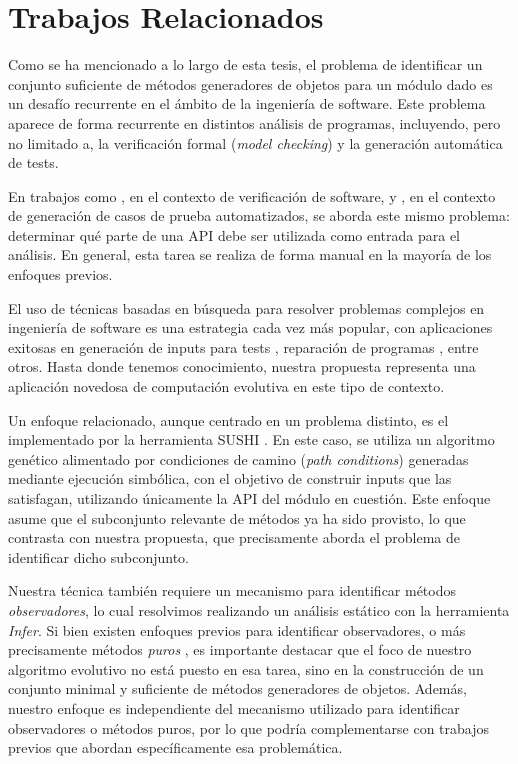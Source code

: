 \chapter[Trabajos Relacionados]{Trabajos Relacionados}
\label{cap:related-work}

Como se ha mencionado a lo largo de esta tesis, el problema de identificar un conjunto suficiente de métodos generadores de objetos 
para un módulo dado es un desafío recurrente en el ámbito de la ingeniería de software. Este problema
aparece de forma recurrente en distintos análisis de programas, incluyendo, pero no limitado a, la verificación formal 
(\emph{model checking}) y la generación automática de tests.

En trabajos como \cite{DBLP:conf/tacas/NoriRTT09,DBLP:conf/tacas/KhurshidPV03}, en el contexto de verificación 
de software, y \cite{Tillmann:2010,Tillmann:2008,paPacheco07,DBLP:conf/icse/BraioneDMP18}, en el contexto de generación de 
casos de prueba automatizados, se aborda este mismo problema: determinar qué parte de una API debe ser utilizada como entrada 
para el análisis. En general, esta tarea se realiza de forma manual en la mayoría de los enfoques previos.

El uso de técnicas basadas en búsqueda para resolver problemas complejos en ingeniería de software es una estrategia cada vez 
más popular, con aplicaciones exitosas en generación de inputs para tests \cite{Fraser:2011}, reparación de programas 
\cite{DBLP:journals/tse/GouesNFW12}, entre otros. Hasta donde tenemos conocimiento, nuestra propuesta representa 
una aplicación novedosa de computación evolutiva en este tipo de contexto.

Un enfoque relacionado, aunque centrado en un problema distinto, es el implementado por la herramienta \textsf{SUSHI} 
\cite{DBLP:conf/icse/BraioneDMP18}. En este caso, se utiliza un algoritmo genético alimentado por condiciones de camino 
(\emph{path conditions}) generadas mediante ejecución simbólica, con el objetivo de construir inputs que las satisfagan, 
utilizando únicamente la API del módulo en cuestión. Este enfoque asume que el subconjunto relevante de métodos ya 
ha sido provisto, lo que contrasta con nuestra propuesta, que precisamente aborda el problema de identificar dicho subconjunto.

Nuestra técnica también requiere un mecanismo para identificar métodos \emph{observadores}, lo cual resolvimos realizando un análisis estático con
la herramienta \emph{Infer}. Si bien existen enfoques previos para identificar observadores, o más precisamente métodos \emph{puros} \cite{Huang:2012,Salcianu:2005}, es importante destacar que el 
foco de nuestro algoritmo evolutivo no está puesto en esa tarea, sino en la construcción de un conjunto minimal y suficiente 
de métodos generadores de objetos.
Además, nuestro enfoque es independiente del mecanismo utilizado para identificar observadores o métodos puros, por lo que podría 
complementarse con trabajos previos que abordan específicamente esa problemática.


